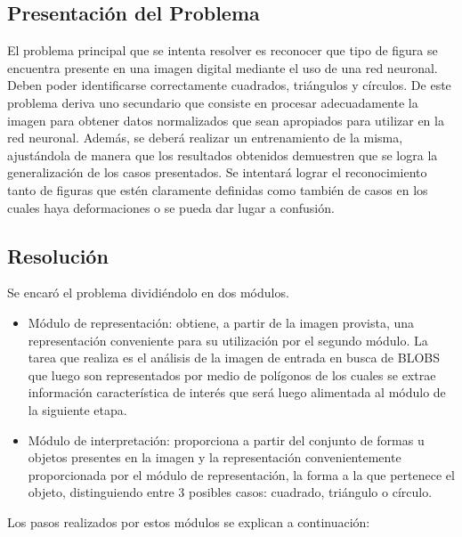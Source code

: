 \documentclass[pdftex,a4paper,12pt]{article}
\begin{document}
\subsection{Presentaci\'on del Problema}
El problema principal que se intenta resolver es reconocer que tipo de figura se encuentra presente en una imagen digital mediante el uso de una red neuronal. Deben poder identificarse correctamente cuadrados, tri\'angulos y c\'irculos. De este problema deriva uno secundario que consiste en procesar adecuadamente la imagen para obtener datos normalizados que sean apropiados para utilizar en la red neuronal. Adem\'as, se deber\'a realizar un entrenamiento de la misma, ajust\'andola de manera que los resultados obtenidos demuestren que se logra la generalizaci\'on de los casos presentados. Se intentar\'a lograr el reconocimiento tanto de figuras que est\'en claramente definidas como tambi\'en de casos en los cuales haya deformaciones o se pueda dar lugar a confusi\'on.


\subsection{Resoluci\'on}
Se encar\'o el problema dividi\'endolo en dos m\'odulos.
\begin{itemize}
\item 
M\'odulo de representaci\'on: obtiene, a partir de la imagen provista, una representaci\'on conveniente para su utilizaci\'on por el segundo m\'odulo. La tarea que realiza es el an\'alisis de la imagen de entrada en busca de BLOBS que luego son representados por medio de pol\'igonos de los cuales se extrae informaci\'on caracter\'istica de inter\'es que ser\'a luego alimentada al m\'odulo de la siguiente etapa.
\item
M\'odulo de interpretaci\'on: proporciona a partir del conjunto de formas u objetos presentes en la imagen y la representaci\'on convenientemente proporcionada por el m\'odulo de representaci\'on, la forma a la que pertenece el objeto, distinguiendo entre 3 posibles casos: cuadrado, tri\'angulo o c\'irculo.
\end{itemize}



Los pasos realizados por estos m\'odulos se explican a continuaci\'on:
\end{document}
